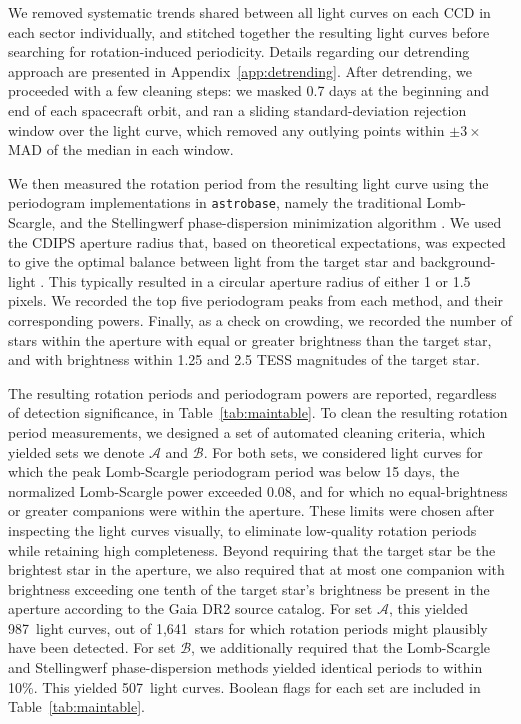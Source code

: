 \documentclass[12pt,twocolumn,tighten]{aastex63}
\newcommand{\nautorotdenominator}{1{,}641} %
\newcommand{\nautorotnumerator}{987} %
\newcommand{\nautorotnumeratormatching}{507} %
\begin{document}
We removed systematic trends shared between all light curves on each
CCD in each sector individually, and stitched together the resulting
light curves before searching for rotation-induced periodicity.
Details regarding our detrending approach are presented in
Appendix~\ref{app:detrending}.  After detrending, we proceeded with a
few cleaning steps: we masked 0.7 days at the beginning and end of
each spacecraft orbit, and ran a sliding standard-deviation rejection
window over the light curve, which removed any outlying points within
$\pm3\times$MAD of the median in each window.

We then measured the rotation period from the resulting light curve
using the periodogram implementations in \texttt{astrobase}, namely
the traditional Lomb-Scargle, and the Stellingwerf phase-dispersion
minimization algorithm
\citep{lomb_1976,stellingwerf_period_1978,scargle_studies_1982,stellingwerf_period_2011,bhatti_astrobase_2018}.
We used the CDIPS aperture radius that, based on theoretical
expectations, was expected to give the optimal balance between light
from the target star and background-light \citep{Sullivan_2015}.  This
typically resulted in a circular aperture radius of either 1 or 1.5 pixels.
We recorded the top five periodogram peaks from each method, and their
corresponding powers.  Finally, as a check on crowding, we recorded
the number of stars within the aperture with equal or greater
brightness than the target star, and with brightness within 1.25 and
2.5 TESS magnitudes of the target star.

The resulting rotation periods and periodogram powers are reported,
regardless of detection significance, in Table~\ref{tab:maintable}.
To clean the resulting rotation period measurements, we designed a set
of automated cleaning criteria, which yielded sets we denote
$\mathcal{A}$ and $\mathcal{B}$.  For both sets, we considered light
curves for which the peak Lomb-Scargle periodogram period was below 15
days, the normalized Lomb-Scargle power exceeded 0.08, and for which
no equal-brightness or greater companions were within the aperture.
These limits were chosen after inspecting the light curves visually,
to eliminate low-quality rotation periods while retaining high
completeness.  Beyond requiring that the target star be the brightest
star in the aperture, we also required that at most one companion with
brightness exceeding one tenth of the target star's brightness be
present in the aperture according to the Gaia DR2 source catalog.  For
set $\mathcal{A}$, this yielded \nautorotnumerator\ light curves, out
of \nautorotdenominator\ stars for which rotation periods might
plausibly have been detected.  For set $\mathcal{B}$, we additionally
required that the Lomb-Scargle and Stellingwerf phase-dispersion
methods yielded identical periods to within 10\%.  This yielded
\nautorotnumeratormatching\ light curves.  Boolean flags for each set
are included in Table~\ref{tab:maintable}.
\end{document}
